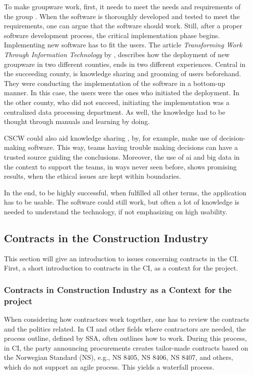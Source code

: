 To make groupware work, first, it needs to meet the needs and requirements of the group \cite{subramanyam2010user}. When the software is thoroughly developed and tested to meet the requirements, one can argue that the software should work. Still, after a proper software development process, the critical implementation phase begins. Implementing new software has to fit the users. The article \textit{Transforming Work Through Information Technology} by \cite{Robey&Sahay}, describes how the deployment of new groupware in two different counties, ends in two different experiences. Central in the succeeding county, is knowledge sharing and grooming of users beforehand. They were conducting the implementation of the software in a bottom-up manner. In this case, the users were the ones who initiated the deployment. In the other county, who did not succeed, initiating the implementation was a centralized data processing department. As well, the knowledge had to be thought through manuals and learning by doing.

CSCW could also aid knowledge sharing \cite{monplaisir2002enhancing}, by, for example, make use of decision-making software. This way, teams having trouble making decisions can have a trusted source guiding the conclusions. Moreover, the use of ai and big data in the context to support the teams, in ways never seen before, shows promising results, when the ethical issues  \cite{jung2017computational} are kept within boundaries.   

In the end, to be highly successful, when fulfilled all other terms, the application has to be usable. The software could still work, but often a lot of knowledge is needed to understand the technology, if not emphasizing on high usability. 

\subsection{Contracts in the Construction Industry}
This section will give an introduction to issues concerning contracts in the CI. First, a short introduction to contracts in the CI, as a context for the project. 

\subsubsection*{Contracts in Construction Industry as a Context for the project}
When considering how contractors work together, one has to review the contracts and the politics related. In CI and other fields where contractors are needed, the process outline, defined by SSA, often outlines how to work. During this process, in CI, the party announcing procurements creates tailor-made contracts based on the Norwegian Standard (NS), e.g., NS 8405, NS 8406, NS 8407, and others, which do not support an agile process. This yields a waterfall process. 

